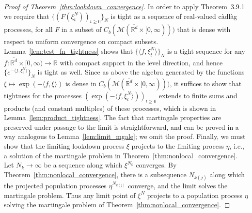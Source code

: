 \documentclass[EJP]{ejpecp} %
\newcommand{\IR}{\mathbb R}
\newcommand{\lp}{\xi}              %
\newcommand{\lpmeasures}{\mathcal{M}(\overline{\IR^d} \times [0,\infty))} %
\newcommand{\citet}[1]{\cite{#1}}
\begin{document}
\begin{proof}[Proof of Theorem~\ref{thm:lookdown_convergence}]
    In order to apply \citet{ethier/kurtz:1986} Theorem~3.9.1
    we require that $\{(F(\lp^N_t))_{t \ge 0}\}_N$
    is tight as a sequence of real-valued c\`adl\`ag processes, for all $F$ in a subset
    of $C_b(\lpmeasures)$ %
    that is dense with respect to uniform convergence on compact subsets.
    Lemma~\ref{lem:test_fn_tightness} shows that
    $\{\langle f, \lp^N_t \rangle\}_N$ is a tight sequence
    for any $f: \overline{\IR^d} \times [0,\infty) \to \IR$ with compact support
    in the level direction,
    and hence $\{e^{-\langle f, \lp^N_t \rangle}\}_N$ is tight as well.
    Since as above the algebra generated by the functions $\lp \mapsto \exp(-\langle f, \lp \rangle)$
    is dense in $C_b(\lpmeasures)$,
    it suffices to show that tightness for the processes $(\exp(-\langle f, \lp^N_t\rangle))_{t \ge 0}$
    extends to finite sums and products (and constant multiples) of these processes,
    which is shown in Lemma~\ref{lem:product_tightness}.
    The fact that martingale properties are preserved under passage to the limit
    is straightforward, and can be proved in a way analogous to Lemma~\ref{lem:limit_mgale};
    we omit the proof.
    Finally, we must show that the limiting lookdown process $\lp$
    projects to the limiting process $\eta$, i.e., a solution of the martingale
    problem in Theorem~\ref{thm:nonlocal_convergence}.
    Let $N_k \to \infty$ be a sequence along which $\lp^{N_k}$ converges.
    By Theorem~\ref{thm:nonlocal_convergence},
    there is a subsequence $N_{k(j)}$ along which the projected population processes
    $\eta^{N_{k(j)}}$ converge, and the limit solves the martingale problem.
    Thus any limit point of $\lp^N$ projects to a population process $\eta$
    solving the martingale problem of Theorem~\ref{thm:nonlocal_convergence}.
\end{proof}
\end{document}
